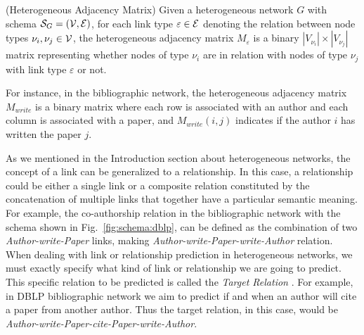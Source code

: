 \begin{definition}{(Heterogeneous Adjacency Matrix)}
Given a heterogeneous network $G$ with schema $\mathcal{S}_G=(\mathcal{V}, \mathcal{E})$, for each link type $\varepsilon\in\mathcal{E}$ denoting the relation between node types $\nu_i,\nu_j\in\mathcal{V}$, the heterogeneous adjacency matrix $M_{\varepsilon}$ is a binary $|V_{\nu_i}| \times |V_{\nu_j}|$ matrix representing whether nodes of type $\nu_i$ are in relation with nodes of type $\nu_j$ with link type $\varepsilon$ or not.
\end{definition}

For instance, in the bibliographic network, the heterogeneous adjacency matrix $M_{write}$ is a binary matrix where each row is associated with an author and each column is associated with a paper, and $M_{write}{(i,j)}$ indicates if the author $i$ has written the paper $j$.


As we mentioned in the Introduction section about heterogeneous networks, the concept of a link can be generalized to a relationship. In this case, a relationship could be either a single link or a composite relation constituted by the concatenation of multiple links that together have a particular semantic meaning. For example, the co-authorship relation in the bibliographic network with the schema shown in Fig.~\ref{fig:schema:dblp}, can be defined as the combination of two \emph{Author-{write}-Paper} links, making \emph{Author-{write}-Paper-{write}-Author} relation. When dealing with link or relationship prediction in heterogeneous networks, we must exactly specify what kind of link or relationship we are going to predict. This specific relation to be predicted is called the \emph{Target Relation} \cite{sun2012will}. For example, in DBLP bibliographic network we aim to predict if and when an author will cite a paper from another author. Thus the target relation, in this case, would be \emph{Author-{write}-Paper-{cite}-Paper-{write}-Author}.

